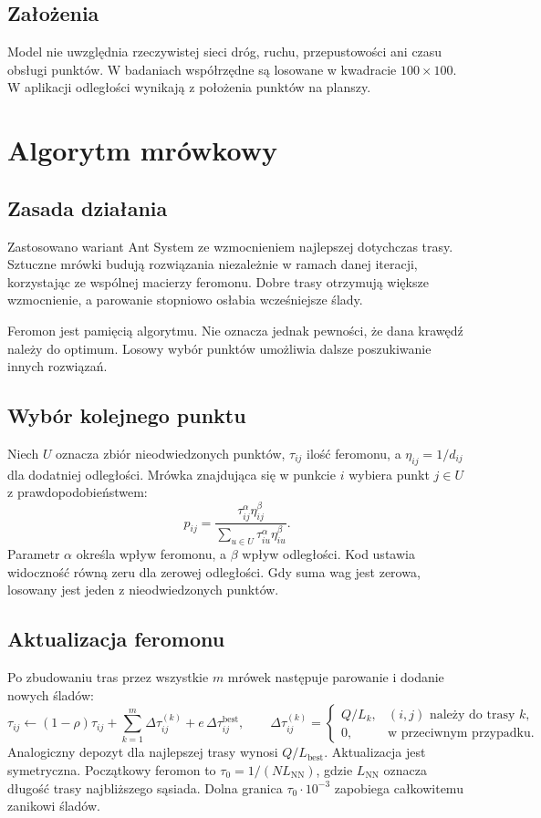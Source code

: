 \documentclass[11pt,a4paper]{article}
\newcommand{\rozdzial}[1]{\clearpage\section{#1}}
\begin{document}
\subsection{Założenia}
Model nie uwzględnia rzeczywistej sieci dróg, ruchu, przepustowości ani czasu obsługi punktów. W badaniach współrzędne są losowane w kwadracie $100\times100$. W aplikacji odległości wynikają z położenia punktów na planszy.

\rozdzial{Algorytm mrówkowy}
\subsection{Zasada działania}
Zastosowano wariant Ant System ze wzmocnieniem najlepszej dotychczas trasy. Sztuczne mrówki budują rozwiązania niezależnie w ramach danej iteracji, korzystając ze wspólnej macierzy feromonu. Dobre trasy otrzymują większe wzmocnienie, a parowanie stopniowo osłabia wcześniejsze ślady.

Feromon jest pamięcią algorytmu. Nie oznacza jednak pewności, że dana krawędź należy do optimum. Losowy wybór punktów umożliwia dalsze poszukiwanie innych rozwiązań.

\subsection{Wybór kolejnego punktu}
Niech $U$ oznacza zbiór nieodwiedzonych punktów, $\tau_{ij}$ ilość feromonu, a $\eta_{ij}=1/d_{ij}$ dla dodatniej odległości. Mrówka znajdująca się w punkcie $i$ wybiera punkt $j\in U$ z prawdopodobieństwem:
\begin{equation}
p_{ij}=\frac{\tau_{ij}^{\alpha}\eta_{ij}^{\beta}}
{\displaystyle\sum_{u\in U}\tau_{iu}^{\alpha}\eta_{iu}^{\beta}}.
\end{equation}
Parametr $\alpha$ określa wpływ feromonu, a $\beta$ wpływ odległości. Kod ustawia widoczność równą zeru dla zerowej odległości. Gdy suma wag jest zerowa, losowany jest jeden z nieodwiedzonych punktów.

\subsection{Aktualizacja feromonu}
Po zbudowaniu tras przez wszystkie $m$ mrówek następuje parowanie i dodanie nowych śladów:
\begin{equation}
\tau_{ij}\leftarrow(1-\rho)\tau_{ij}
+\sum_{k=1}^{m}\Delta\tau_{ij}^{(k)}+e\,\Delta\tau_{ij}^{\mathrm{best}},
\qquad
\Delta\tau_{ij}^{(k)}=
\begin{cases}
Q/L_k,&(i,j)\text{ należy do trasy }k,\\
0,&\text{w przeciwnym przypadku.}
\end{cases}
\end{equation}
Analogiczny depozyt dla najlepszej trasy wynosi $Q/L_{\mathrm{best}}$. Aktualizacja jest symetryczna. Początkowy feromon to $\tau_0=1/(N L_{\mathrm{NN}})$, gdzie $L_{\mathrm{NN}}$ oznacza długość trasy najbliższego sąsiada. Dolna granica $\tau_0\cdot10^{-3}$ zapobiega całkowitemu zanikowi śladów.
\end{document}

